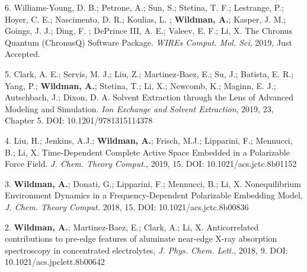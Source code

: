 


\begin{cvpublications}


\cvpublication
{6.} 
{Williams-Young, D. B.; Petrone, A.; Sun, S.; Stetina, T. F.; Lestrange, P.;
Hoyer,  C. E.;  Nascimento, D. R.; Koulias, L. ; \textbf{Wildman, A.}; Kasper, J. M.; 
Goings, J. J.; Ding, F. ; DePrince III, A. E.; Valeev, E. F.; Li, X. The Chronus
Quantum (ChronusQ) Software Package. \textit{WIREs Comput. Mol. Sci}, 2019, Just
Accepted.}


\cvpublication
{5.} 
{Clark, A. E.; Servis, M. J.; Liu, Z.; Martinez-Baez, E.; Su, J.; Batista, E.
R.; Yang, P.; \textbf{Wildman, A.}; Stetina, T.; Li, X.; Newcomb, K.; Maginn,
E. J.; Autschbach, J.; Dixon, D. A.  Solvent Extraction through the Lens of
Advanced Modeling and Simulation.  \textit{Ion Exchange and Solvent
Extraction}, 2019, 23, Chapter 5. DOI: 10.1201/9781315114378}

\cvpublication
{4.} 
{Liu, H.; Jenkins, A.J.; \textbf{Wildman, A.}; Frisch, M.J.; Lipparini, F.; Mennucci,
B.; Li, X. Time-Dependent Complete Active Space Embedded in a Polarizable Force
Field.  \textit{J. Chem. Theory Comput.}, 2019, 15. DOI:
10.1021/acs.jctc.8b01152} 


\cvpublication
{3.} 
{\textbf{Wildman, A.}; Donati, G.; Lipparini, F.; Mennucci, B.; Li, X.
Nonequilibrium Environment Dynamics in a Frequency-Dependent Polarizable
Embedding Model, \textit{J. Chem. Theory Comput.} 2018, 15. DOI:
10.1021/acs.jctc.8b00836} 


\cvpublication
{2.} 
{\textbf{Wildman, A.}; Martinez-Baez, E.; Clark, A.; Li, X. Anticorrelated
contributions to pre-edge features of aluminate near-edge X-ray absorption
spectroscopy in concentrated electrolytes, \textit{J. Phys. Chem. Lett.},
2018, 9. DOI: 10.1021/acs.jpclett.8b00642} 


\end{cvpublications}
